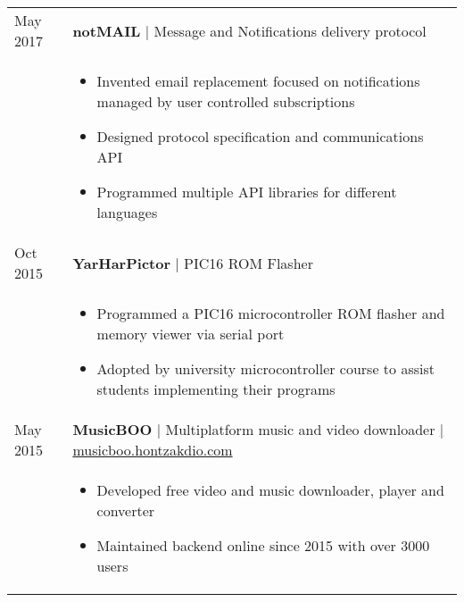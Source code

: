\documentclass[a4paper,10pt]{article}
\begin{document}
\begin{tabular}{p{1.5cm}p{14.8cm}}
 May 2017 & \textbf{notMAIL} | Message and Notifications delivery protocol \\
 & \footnotesize{ \begin{itemize}[noitemsep,topsep=3pt]
 \vspace{-0.1in}
 \item Invented email replacement focused on notifications managed by user controlled subscriptions
 \item Designed protocol specification and communications API
 \item Programmed multiple API libraries for different languages
 \end{itemize}} \vspace{-0.1in} \\ 

 Oct 2015 & \textbf{YarHarPictor} | PIC16 ROM Flasher \\
 & \footnotesize{ \begin{itemize}[noitemsep,topsep=3pt]
 \vspace{-0.1in}
 \item Programmed a PIC16 microcontroller ROM flasher and memory viewer via serial port
 \item Adopted by university microcontroller course to assist students implementing their programs
 \end{itemize}} \vspace{-0.1in} \\ 

 May 2015 & \textbf{MusicBOO} | Multiplatform music and video downloader \href{http://musicboo.hontzakdio.com/}{\hfill | \footnotesize musicboo.hontzakdio.com}\\
 & \footnotesize{ \begin{itemize}[noitemsep,topsep=3pt]
 \vspace{-0.1in}
 \item Developed free video and music downloader, player and converter
 \item Maintained backend online since 2015 with over 3000 users
 \end{itemize}} \vspace{-0.1in} \\ 



\end{tabular}
\end{document}
